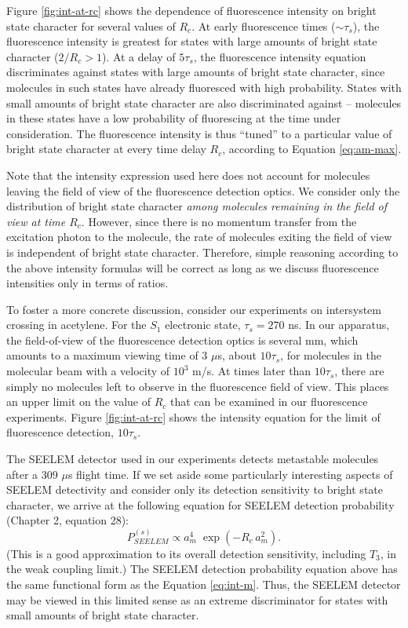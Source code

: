 \documentclass[12pt,draft]{mitthesis}
\begin{document}
Figure \ref{fig:int-at-rc} shows the dependence of fluorescence
intensity on bright state character for several values of $R_c$.  At
early fluorescence times ($\sim \tau_s$), the fluorescence intensity
is greatest for states with large amounts of bright state character
($2/R_c > 1$).  At a delay of $5 \tau_s$, the fluorescence intensity
equation discriminates against states with large amounts of bright
state character, since molecules in such states have already
fluoresced with high probability.  States with small amounts of bright
state character are also discriminated against -- molecules in these
states have a low probability of fluorescing at the time under
consideration.  The fluorescence intensity is thus ``tuned'' to a
particular value of bright state character at every time delay $R_c$,
according to Equation \ref{eq:am-max}.

Note that the intensity expression used here does not account for
molecules leaving the field of view of the fluorescence detection
optics.  We consider only the distribution of bright state character
\emph{among molecules remaining in the field of view at time $R_c$}.
However, since there is no momentum transfer from the excitation
photon to the molecule, the rate of molecules exiting the field of
view is independent of bright state character.  Therefore,
simple reasoning according to the above intensity formulas will be
correct as long as we discuss fluorescence intensities only in terms
of ratios.

To foster a more concrete discussion, consider our experiments on
intersystem crossing in acetylene.  For the $S_1$ electronic state,
$\tau_s=270$ ns.  In our apparatus, the field-of-view of the
fluorescence detection optics is several mm, which amounts to a
maximum viewing time of 3 $\mu$s, about $10\tau_s$, for molecules in
the molecular beam with a velocity of $10^3$ m/s.  At times later than
$10\tau_s$, there are simply no molecules left to observe in the
fluorescence field of view.  This places an upper limit on the value
of $R_c$ that can be examined in our fluorescence experiments.  Figure
\ref{fig:int-at-rc} shows the intensity equation for the limit of
fluorescence detection, $10\tau_s$.

The SEELEM detector used in our experiments detects metastable
molecules after a 309 $\mu$s flight time.  If we set aside some
particularly interesting aspects of SEELEM detectivity and consider
only its detection sensitivity to bright state character, we arrive at
the following equation for SEELEM detection probability (Chapter 2,
equation 28):
\begin{equation}
  \label{eq:seelem-prob-s}
  P_{SEELEM}^{(s)} \propto a_m^4 \; \exp \left( -R_c \, a_m^2 \right).
\end{equation}
(This is a good approximation to its overall detection sensitivity,
including $T_3$, in the weak coupling limit.)  The SEELEM detection
probability equation above has the same functional form as the
Equation \ref{eq:int-m}.  Thus, the SEELEM detector may be viewed in
this limited sense as an extreme discriminator for states with small
amounts of bright state character.
\end{document}
